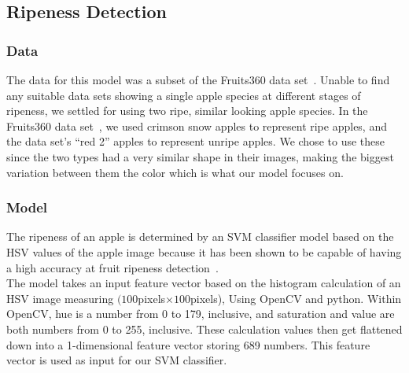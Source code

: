 \subsection{Ripeness Detection}
\subsubsection{Data}
The data for this model was a subset of the Fruits360 data set~\cite{Fruit360}.
Unable to find any suitable data sets showing a single apple species at different stages of ripeness, we settled for using two ripe, similar looking apple species.
In the Fruits360 data set~\cite{Fruit360}, we used crimson snow apples to represent ripe apples, and the data set's ``red 2'' apples to represent unripe apples. We  chose to use these since the two types had a very similar shape in their images, making the biggest variation between them the color which is what our model focuses on.

\subsubsection{Model}
The ripeness of an apple is determined by an SVM classifier model based on the HSV values of the apple image because it has been shown to be capable of having a high accuracy at fruit ripeness detection~\cite{HSVRipeness}.\\
The model takes an input feature vector based on the histogram calculation of an HSV image measuring $(100$pixels$\times100$pixels), Using OpenCV and python.
Within OpenCV, hue is a number from 0 to 179, inclusive, and saturation and value are both numbers from 0 to 255, inclusive.
These calculation values then get flattened down into a 1-dimensional feature vector storing 689 numbers. 
This feature vector is used as input for our SVM classifier.\\

